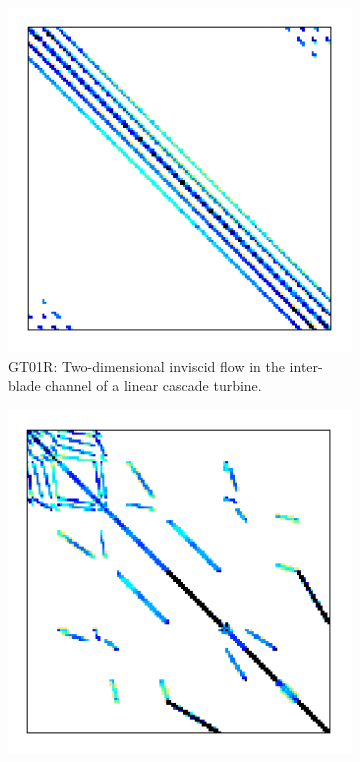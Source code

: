   		\begin{figure}
  			\centering
  			\begin{subfigure}[t]{0.3\textwidth}
  				\centering
  				\includegraphics[width=\textwidth]{figures/GT01R.png}
          \caption{GT01R: Two-dimensional inviscid flow in the inter-blade channel of a linear cascade turbine.}
  				\label{fig:sparse.GT01R}
  			\end{subfigure}
  			\hfill
  			\begin{subfigure}[t]{0.3\textwidth}
  				\centering
  				\includegraphics[width=\textwidth]{figures/HV15R.png}

\end{subfigure}
\end{figure}
